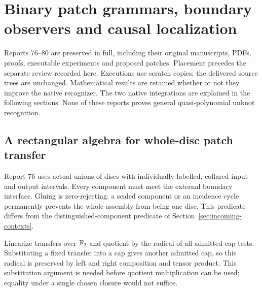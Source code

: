 \section{Binary patch grammars, boundary observers and causal localization}
\label{sec:incoming-eaad}

Reports 76--80 are preserved in full, including their original manuscripts,
PDFs, proofs, executable experiments and proposed patches. Placement
 precedes the separate review recorded here. Executions use
scratch copies; the delivered source trees are unchanged. Mathematical
results are retained whether or not they improve the native recognizer.
The two native integrations are explained in the following sections.
None of these reports proves general quasi-polynomial unknot recognition.

\subsection{A rectangular algebra for whole-disc patch transfer}

Report 76 uses actual unions of discs with individually labelled, collared
input and output intervals. Every component must meet the external boundary
interface. Gluing is zero-rejecting: a sealed component or an incidence
cycle permanently prevents the whole assembly from being one disc.
This predicate differs from the distinguished-component predicate of
Section~\ref{sec:incoming-contexts}.

Linearize transfers over $\mathbb{F}_2$ and quotient by the radical of all admitted
cap tests. Substituting a fixed transfer into a cap gives another admitted
cap, so this radical is preserved by left and right composition and tensor
product. This substitution argument is needed before quotient multiplication
can be used; equality under a single chosen closure would not suffice.

